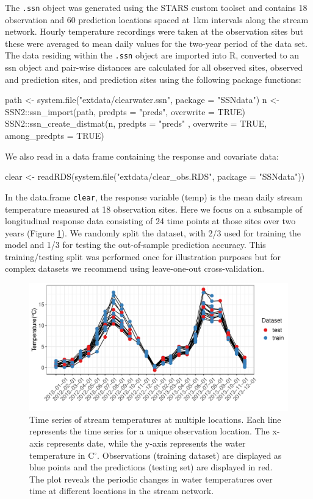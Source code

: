 The \texttt{.ssn} object was generated using the STARS custom toolset \citep{peterson2014stars} and contains 18 observation and 60 prediction locations spaced at 1km intervals along the stream network. 
Hourly temperature recordings were taken at the observation sites but these were averaged to mean daily values for the two-year period of the data set.
The data residing within the \texttt{.ssn} object are imported into R, converted to an ssn object and 
pair-wise distances are calculated for all observed sites, observed and prediction sites, and prediction sites using the following  package functions:

\begin{example}
path <- system.file("extdata/clearwater.ssn", package = "SSNdata")
n <-  SSN2::ssn_import(path, predpts = "preds", overwrite  = TRUE)
SSN2::ssn_create_distmat(n,
                         predpts = "preds" ,
                         overwrite = TRUE,
                         among_predpts  = TRUE)
\end{example}

\noindent We also read in a data frame containing the response and covariate data:

\begin{example}
clear <- readRDS(system.file("extdata/clear_obs.RDS", package = "SSNdata"))
\end{example}

In the data.frame \texttt{clear}, the response variable (temp) is the mean daily stream temperature measured at 18 observation sites.
Here we focus on a subsample of longitudinal response data consisting of 24 time points at those sites over two years (Figure \ref{figure:ts}). We randomly split the dataset, with 2/3 used for training the model and 1/3 for testing the out-of-sample prediction accuracy.
This training/testing split was performed once for illustration purposes but for complex datasets we recommend using leave-one-out cross-validation.



\begin{figure}[htbp]
  \centering
   \includegraphics[width=4.5in]{./Figs_Pay/ts.pdf}
  \caption{
  Time series of stream temperatures at multiple locations. Each line represents the time series for a unique observation location. The x-axis represents date, while the y-axis represents the water temperature in C$^{\circ}$. 
Observations (training dataset) are displayed as blue points and the predictions (testing set) are displayed in red. The plot reveals the periodic changes in water temperatures over time at different locations in the stream network.
}
  \label{figure:ts}
\end{figure}


